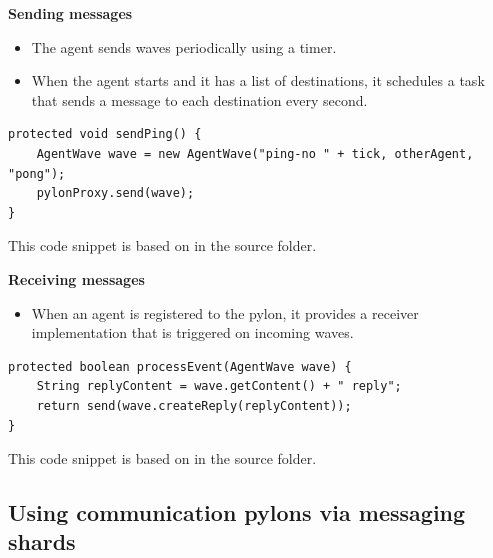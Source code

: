 \documentclass[10pt,aspectratio=169]{beamer}
\begin{document}
\begin{frame}[fragile]

\textbf{Sending messages}

\begin{itemize}
    \item The agent sends waves periodically using a timer.
    \item When the agent starts and it has a list of destinations, it schedules a task that sends a message to each destination every second.
\end{itemize}

\begin{lstlisting}
protected void sendPing() {
    AgentWave wave = new AgentWave("ping-no " + tick, otherAgent, "pong");
    pylonProxy.send(wave);
}
\end{lstlisting}

{\small This code snippet is based on  in the  source folder.}


\end{frame}

\begin{frame}[fragile]

\textbf{Receiving messages}

\begin{itemize}
    \item When an agent is registered to the pylon, it provides a receiver implementation that is triggered on incoming waves.
\end{itemize}

\begin{lstlisting}
protected boolean processEvent(AgentWave wave) {
    String replyContent = wave.getContent() + " reply";
    return send(wave.createReply(replyContent));
}
\end{lstlisting}

{\small This code snippet is based on  in the  source folder.}


\end{frame}

\subsection{Using communication pylons via messaging shards}
\end{document}

